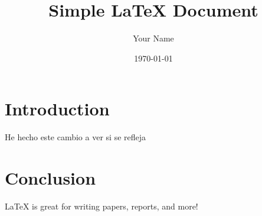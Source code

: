 \documentclass{article}
\begin{document}
\title{Simple LaTeX Document}
\author{Your Name}
\date{\today}

\maketitle

\section{Introduction}
He hecho este cambio a ver si se refleja

\section{Conclusion}
LaTeX is great for writing papers, reports, and more!
\end{document}
